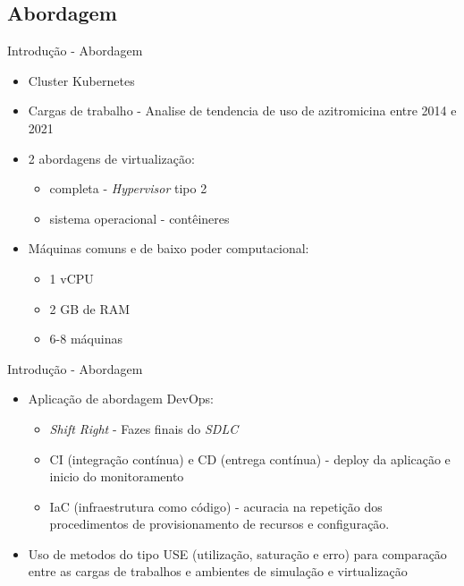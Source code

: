 \documentclass[10pt,brazil]{beamer}
\theoremstyle{definition}
\begin{document}
\subsection{Abordagem}
\begin{frame}{Introdução - Abordagem}
  \begin{itemize}

    \item Cluster Kubernetes\textregistered
    \item Cargas de trabalho - Analise de tendencia de uso de azitromicina entre 2014 e 2021
    \item 2 abordagens de virtualização:
          \begin{itemize}
            \item completa - \emph{Hypervisor} tipo 2
            \item sistema operacional - contêineres
          \end{itemize}
    \item Máquinas comuns e de baixo poder computacional:
          \begin{itemize}
            \item 1 vCPU
            \item 2 GB de RAM
            \item 6-8 máquinas
          \end{itemize}
  \end{itemize}
\end{frame}

\begin{frame}{Introdução - Abordagem}
  \begin{itemize}
    \item Aplicação de abordagem DevOps:
          \begin{itemize}
            \item \emph{Shift Right} - Fazes finais do \emph{SDLC}
            \item CI (integração contínua) e CD (entrega contínua) - deploy da aplicação e inicio do monitoramento
            \item IaC (infraestrutura como código) - acuracia na repetição dos procedimentos de provisionamento de recursos e configuração.
          \end{itemize}
    \item Uso de metodos do tipo USE (utilização, saturação e erro) para comparação entre as cargas de trabalhos e ambientes de simulação e virtualização
  \end{itemize}
\end{frame}
\end{document}
